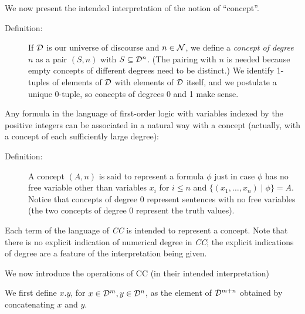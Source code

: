 We now present the intended interpretation of the notion of
``concept''.
\begin{description} \item[Definition:] If ${\cal D}$ is our universe
of discourse and $n \in {\cal N}$, we define a {\em concept of degree
$n$\/} as a pair $(S,n)$ with $S \subseteq {\cal D}^n$.  (The pairing
with $n$ is needed because empty concepts of different degrees need to
be distinct.)  We identify 1-tuples of elements of ${\cal D}$ with
elements of ${\cal D\/}$ itself, and we postulate a unique 0-tuple, so
concepts of degrees 0 and 1 make sense. \end{description}

Any formula in the language of first-order logic with variables
indexed by the positive integers can be associated in a natural way
with a concept (actually, with a concept of each sufficiently large
degree):

\begin{description}

\item[Definition:] A concept $(A,n)$ is said to represent a formula
$\phi$ just in case $\phi$ has no free variable other than variables
$x_i$ for $i \leq n$ and $\{(x_1,\ldots,x_n) \mid \phi\} = A$.  Notice
that concepts of degree 0 represent sentences with no free variables
(the two concepts of degree 0 represent the truth values).

\end{description}

Each term of the language of {\em CC\/} is intended to represent a
concept.  Note that there is no explicit indication of numerical
degree in {\em CC\/}; the explicit indications of degree are a feature
of the interpretation being given.

We now introduce the operations of CC (in their intended interpretation)

We first define $x.y$, for $x \in {\cal D}^m, y \in {\cal D}^n$, as
the element of ${\cal D}^{m+n}$ obtained by concatenating $x$ and $y$.

